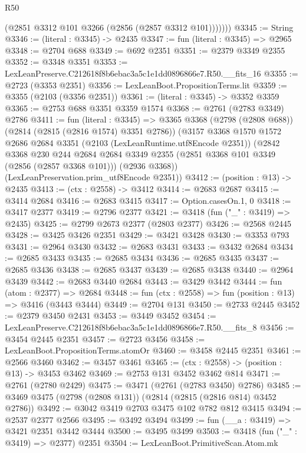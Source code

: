 \begin{lexlean}{R50}
\begin{coremodule}
            (@2851 @3312 @101 @3266 (@2856 (@2857 @3312 @101)))))))
@3345 := String
@3346 := (literal : @3345) -> @2435
@3347 := fun (literal : @3345) => @2965
@3348 := @2704 @688
@3349 := @692 @2351
@3351 := @2379 @3349 @2355
@3352 := @3348 @3351
@3353 := LexLeanPreserve.C212618f8b6ebac3a5c1e1dd0896866e7.R50.__fits_16
@3355 := @2723 (@3353 @2351)
@3356 := LexLeanBoot.PropositionTerms.lit
@3359 := @3355 (@2103 (@3356 @2351))
@3361 := (literal : @3345) -> @3352 @3359
@3365 := @2753 @688 @3351 @3359 @1574
@3368 := @2761 (@2783 @3349) @2786
@3411 := fun (literal : @3345) =>
  @3365
    @3368
    (@2798 (@2808 @688))
    (@2814 (@2815 (@2816 @1574) @3351 @2786))
    (@3157
      @3368
      @1570
      @1572
      @2686
      @2684
      @3351
      (@2103 (LexLeanRuntime.utf8Encode @2351))
      (@2842
        @3368
        @230
        @244
        @2684
        @2684
        @3349
        @2355
        (@2851 @3368 @101 @3349 (@2856 (@2857 @3368 @101)))
        (@2936 @3368))
      (LexLeanPreservation.prim_utf8Encode @2351))
@3412 := (position : @13) -> @2435
@3413 := (ctx : @2558) -> @3412
@3414 := @2683 @2687
@3415 := @3414 @2684
@3416 := @2683 @3415
@3417 := Option.casesOn.{1, 0}
@3418 := @3417 @2377
@3419 := @2796 @2377
@3421 := @3418 (fun ("_" : @3419) => @2435)
@3425 := @2799 @2673 @2377 (@2803 @2377)
@3426 := @2568 @2445
@3428 := @3425 @3426 @2351
@3429 := @3421 @3428
@3430 := @3353 @793
@3431 := @2964 @3430
@3432 := @2683 @3431
@3433 := @3432 @2684
@3434 := @2685 @3433
@3435 := @2685 @3434
@3436 := @2685 @3435
@3437 := @2685 @3436
@3438 := @2685 @3437
@3439 := @2685 @3438
@3440 := @2964 @3439
@3442 := @2683 @3440 @2684
@3443 := @3429 @3442
@3444 := fun (atom : @2377) => @2684
@3448 := fun (ctx : @2558) => fun (position : @13) => @3416 (@3443 @3444)
@3449 := @2704 @131
@3450 := @2733 @2445
@3452 := @2379 @3450 @2431
@3453 := @3449 @3452
@3454 := LexLeanPreserve.C212618f8b6ebac3a5c1e1dd0896866e7.R50.__fits_8
@3456 := @3454 @2445 @2351
@3457 := @2723 @3456
@3458 := LexLeanBoot.PropositionTerms.atomOr
@3460 := @3458 @2445 @2351
@3461 := @2566 @3460
@3462 := @3457 @3461
@3465 := (ctx : @2558) -> (position : @13) -> @3453 @3462
@3469 := @2753 @131 @3452 @3462 @814
@3471 := @2761 (@2780 @2429)
@3475 := @3471 (@2761 (@2783 @3450) @2786)
@3485 := @3469 @3475 (@2798 (@2808 @131)) (@2814 (@2815 (@2816 @814) @3452 @2786))
@3492 := @3042 @3419 @2703 @3475 @102 @782 @812 @3415
@3494 := @2537 @2377 @2566
@3495 := @3492 @3494
@3499 := fun (__a : @3419) => @3421 @2351 @3442 @3444
@3500 := @3495 @3499
@3503 := @3418 (fun ("_" : @3419) => @2377) @2351
@3504 := LexLeanBoot.PrimitiveScan.Atom.mk

\end{coremodule}
\end{lexlean}
